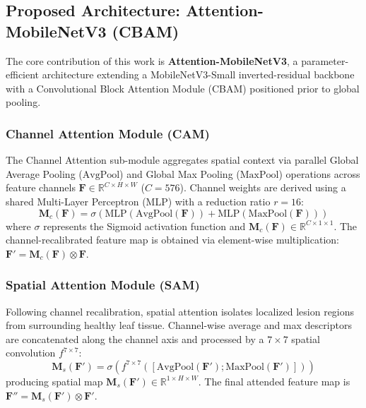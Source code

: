 \documentclass[conference]{IEEEtran}
\begin{document}
\subsection{Proposed Architecture: Attention-MobileNetV3 (CBAM)}
The core contribution of this work is \textbf{Attention-MobileNetV3}, a parameter-efficient architecture extending a MobileNetV3-Small inverted-residual backbone with a Convolutional Block Attention Module (CBAM) positioned prior to global pooling.

\subsubsection{Channel Attention Module (CAM)}
The Channel Attention sub-module aggregates spatial context via parallel Global Average Pooling ($\text{AvgPool}$) and Global Max Pooling ($\text{MaxPool}$) operations across feature channels $\mathbf{F} \in \mathbb{R}^{C \times H \times W}$ ($C = 576$). Channel weights are derived using a shared Multi-Layer Perceptron (MLP) with a reduction ratio $r = 16$:
\begin{equation}
\mathbf{M}_c(\mathbf{F}) = \sigma\left(\text{MLP}(\text{AvgPool}(\mathbf{F})) + \text{MLP}(\text{MaxPool}(\mathbf{F}))\right)
\label{eq:cam}
\end{equation}
where $\sigma$ represents the Sigmoid activation function and $\mathbf{M}_c(\mathbf{F}) \in \mathbb{R}^{C \times 1 \times 1}$. The channel-recalibrated feature map is obtained via element-wise multiplication: $\mathbf{F}' = \mathbf{M}_c(\mathbf{F}) \otimes \mathbf{F}$.

\subsubsection{Spatial Attention Module (SAM)}
Following channel recalibration, spatial attention isolates localized lesion regions from surrounding healthy leaf tissue. Channel-wise average and max descriptors are concatenated along the channel axis and processed by a $7 \times 7$ spatial convolution $f^{7\times 7}$:
\begin{equation}
\mathbf{M}_s(\mathbf{F}') = \sigma\left(f^{7\times 7}\left(\left[\text{AvgPool}(\mathbf{F}'); \text{MaxPool}(\mathbf{F}')\right]\right)\right)
\label{eq:sam}
\end{equation}
producing spatial map $\mathbf{M}_s(\mathbf{F}') \in \mathbb{R}^{1 \times H \times W}$. The final attended feature map is $\mathbf{F}'' = \mathbf{M}_s(\mathbf{F}') \otimes \mathbf{F}'$.
\end{document}
